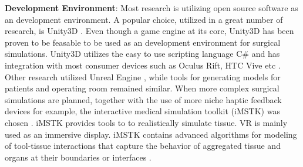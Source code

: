 \textbf{Development Environment}: Most research is utilizing open source software as an development environment.
A popular choice, utilized in a great number of research, is Unity3D \cite{Parham.2019,Pulijala.2017,Sampogna.2017}.
Even though a game engine at its core, Unity3D has been proven to be feasable to be used as an development environment for surgical simulations.
Unity3D utilizes the easy to use scripting language C\# and has integration with most consumer devices such as Oculus Rift, HTC Vive etc \cite{wang2010new}.
\newline
Other research utilized Unreal Engine \cite{Barber.2020}, while tools for generating models for patients and operating room remained similar.
\newline
When more complex surgical simulations are planned, together with the use of more niche haptic feedback devices for example, the interactive medical simulation toolkit (iMSTK) was chosen \cite{VenkataS.Arikatla.2018}.
iMSTK provides tools to to realistically simulate tissue. VR is mainly used as an immersive display.
iMSTK contains advanced algorithms for modeling of tool-tissue interactions that capture the behavior of aggregated tissue and organs at their boundaries or interfaces \cite{VenkataS.Arikatla.2018}.